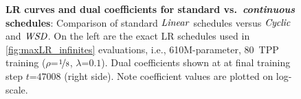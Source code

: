 \begin{figure}
{\begin{minipage}{\textwidth}
      \vspace{-5mm}
      \subcaption{$\cyclic$}
      \label{fig:inf_ema_lrs:cyclic}
    \end{minipage}
  }
  \mbox{}
  \vspace{2mm}
  \mbox{}
  \mbox{}
  \vspace{2mm}
  \mbox{}
  \caption{\textbf{LR curves and dual coefficients for standard
      vs.\ \emph{continuous} schedules}: Comparison of standard
    $\mbox{\emph{Linear}}$ schedules versus $\cyclic$ and $\mbox{\emph{WSD}}$.  On the left are
    the exact LR schedules used in \cref{fig:maxLR_infinites}
    evaluations, i.e., 610M-parameter, 80~TPP training
    ($\rho$=$\nicefrac{1}{8}$, $\lambda$=$0.1$).  Dual coefficients
    shown at at final training step $t$=$47008$ (right side).  Note
    coefficient values are plotted on
    log-scale.\label{fig:inf_ema_lrs}}
\end{figure}
